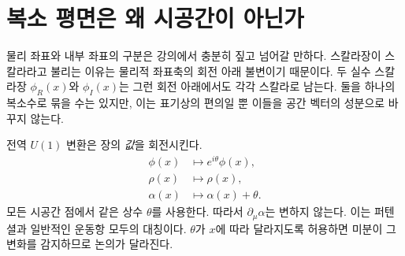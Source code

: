 \begin{classroomqa}\end{classroomqa}

\begin{classroomqa}\end{classroomqa}

\section{복소 평면은 왜 시공간이 아닌가}

물리 좌표와 내부 좌표의 구분은 강의에서 충분히 짚고 넘어갈 만하다. 스칼라장이 스칼라라고 불리는 이유는 물리적 좌표축의 회전 아래 불변이기 때문이다. 두 실수 스칼라장 \(\phi_R(x)\)와 \(\phi_I(x)\)는 그런 회전 아래에서도 각각 스칼라로 남는다. 둘을 하나의 복소수로 묶을 수는 있지만, 이는 표기상의 편의일 뿐 이들을 공간 벡터의 성분으로 바꾸지 않는다.

전역 \(U(1)\) 변환은 장의 \emph{값}을 회전시킨다.
\begin{equation}
\begin{aligned}
  \phi(x)&\longmapsto e^{i\theta}\phi(x),
  \\
  \rho(x)&\longmapsto\rho(x),
  \\
  \alpha(x)&\longmapsto\alpha(x)+\theta.
\end{aligned}
  \label{eq:l08-global-shift}
\end{equation}
모든 시공간 점에서 같은 상수 \(\theta\)를 사용한다. 따라서 \(\partial_\mu\alpha\)는 변하지 않는다. 이는 퍼텐셜과 일반적인 운동항 모두의 대칭이다. \(\theta\)가 \(x\)에 따라 달라지도록 허용하면 미분이 그 변화를 감지하므로 논의가 달라진다.

